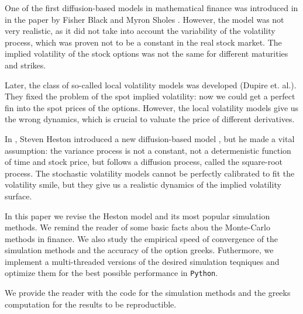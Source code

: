 One of the first diffusion-based models in mathematical finance was introduced in 
\citeyear{BlackSholes1973} in the paper by Fisher Black and Myron Sholes \cite{BlackSholes1973}. 
However, the model was not very realistic, as it did not take into account the variability of
the volatility process, which was proven not to be a constant in the real stock market.
The implied volatility of the stock options was not the same for different maturities and
strikes.

Later, the class of so-called local volatility models was developed (Dupire et. al.). They
fixed the problem of the spot implied volatility: now we could get a perfect fin into the spot 
prices of the options. However, the local volatility models give us the wrong dynamics,
which is crucial to valuate the price of different derivatives.

In \citeyear{Heston1993}, Steven Heston introduced a new diffusion-based model \cite{Heston1993}, but he made a 
vital assumption: the variance process is not a constant, not a determenistic function of time and 
stock price, but follows a diffusion process, called the square-root process. The 
stochastic volatility models cannot be perfectly calibrated to fit the volatility smile, but
they give us a realistic dynamics of the implied volatility surface.

In this paper we revise the Heston model and its most popular simulation methods. We remind
the reader of some basic facts abou the Monte-Carlo methods in finance. We also study the 
empirical speed of convergence of the simulation methods and the accuracy of the option 
greeks. Futhermore, we implement a multi-threaded versions of the desired simulation teqniques 
and optimize them for the best possible performance in \texttt{Python}.

We provide the reader with the code for the simulation methods and the greeks computation for the 
results to be reproductible.